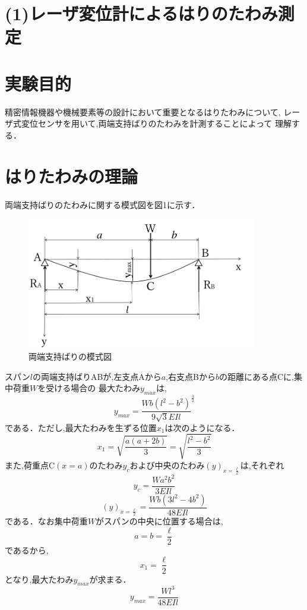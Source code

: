 \documentclass[a4paper,11pt]{jsarticle}
\begin{document}
\section*{(1)レーザ変位計によるはりのたわみ測定}

\section{実験目的}
精密情報機器や機械要素等の設計において重要となるはりたわみについて,
レーザ式変位センサを用いて,両端支持ばりのたわみを計測することによって
理解する．

\section{はりたわみの理論}
両端支持ばりのたわみに関する模式図を図1に示す．

\begin{figure}[h]
  \centering
  \includegraphics[width=10cm]{AB.png}
  \caption{両端支持ばりの模式図}
\end{figure}
スパン$l$の両端支持ばりABが,左支点Aから$a$,右支点Bから$b$の距離にある点Cに,集中荷重$W$を受ける場合の
最大たわみ$y_{max}$は,
\begin{equation}
  y_{max} = {\dfrac{Wb({l^2}-{b^2})}{9\sqrt{3}EIl}}^{\frac{3}{2}}
\end{equation}
である．ただし,最大たわみを生ずる位置$x_1$は次のようになる．
\begin{equation}
  x_1 = {\sqrt{\dfrac{a(a+2b)}{3}}}={\sqrt{\dfrac{{l^2}-{b^2}}{3}}}
\end{equation}
また,荷重点C$(x=a)$のたわみ$y_c$および中央のたわみ$(y)_{x=\frac{\ell}{2}}$は,それぞれ
\begin{equation}
  y_{c} = {\dfrac{Wa^{2}b^{2}}{3EIl}}
\end{equation}
\begin{equation}
  (y)_{x=\frac{\ell}{2}} = {\dfrac{Wb(3l^{2}-4b^{2})}{48EIl}}
\end{equation}
である．なお集中荷重$W$がスパンの中央に位置する場合は,
\begin{equation}
  a = b = \dfrac{\ell}{2}
\end{equation}
であるから,
\begin{equation}
  x_1 = \dfrac{\ell}{2}
\end{equation}
となり,最大たわみ$y_{max}$が求まる．
\begin{equation}
  y_{max} = {\dfrac{Wl^{3}}{48EIl}}
\end{equation}
\end{document}
